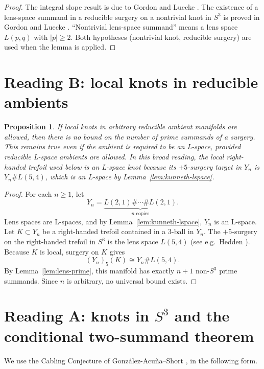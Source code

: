 \documentclass[12pt]{article}
\newtheorem{proposition}[theorem]{Proposition}
\theoremstyle{definition}
\begin{document}
\begin{proof}
The integral slope result is due to Gordon and Luecke \cite{GLIntegral}.  The existence of a lens-space summand in a reducible surgery on a nontrivial knot in \(S^3\) is proved in Gordon and Luecke \cite{GLReducible}.  ``Nontrivial lens-space summand'' means a lens space \(L(p,q)\) with \(|p|\ge 2\).  Both hypotheses (nontrivial knot, reducible surgery) are used when the lemma is applied.
\end{proof}

\section{Reading B: local knots in reducible ambients}
\label{sec:readingB}

\begin{proposition}\label{prop:readingB}
If local knots in arbitrary reducible ambient manifolds are allowed, then there is no bound on the number of prime summands of a surgery.  This remains true even if the ambient is required to be an L-space, provided reducible L-space ambients are allowed.  In this broad reading, the local right-handed trefoil used below is an L-space knot because its \(+5\)-surgery target in \(Y_n\) is \(Y_n\# L(5,4)\), which is an L-space by Lemma~\ref{lem:kunneth-lspace}.
\end{proposition}

\begin{proof}
For each \(n\ge 1\), let
\[
Y_n=\underbrace{L(2,1)\#\cdots\# L(2,1)}_{n\text{ copies}}.
\]
Lens spaces are L-spaces, and by Lemma~\ref{lem:kunneth-lspace}, \(Y_n\) is an L-space.  Let \(K\subset Y_n\) be a right-handed trefoil contained in a 3-ball in \(Y_n\).  The \(+5\)-surgery on the right-handed trefoil in \(S^3\) is the lens space \(L(5,4)\) (see e.g.\ Hedden \cite[Section 1]{Hedden}).  Because \(K\) is local, surgery on \(K\) gives
\[
(Y_n)_5(K)\cong Y_n\# L(5,4).
\]
By Lemma~\ref{lem:lens-prime}, this manifold has exactly \(n+1\) non-\(S^3\) prime summands.  Since \(n\) is arbitrary, no universal bound exists.
\end{proof}

\section{Reading A: knots in \(S^3\) and the conditional two-summand theorem}
\label{sec:readingA}

We use the Cabling Conjecture of González-Acuña--Short \cite{GAS}, in the following form.
\end{document}
